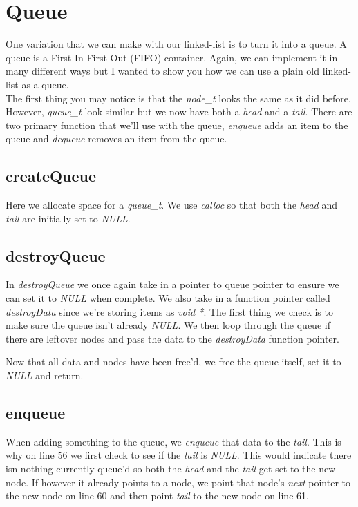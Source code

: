 \documentclass[../main.tex]{subfiles}
\begin{document}
	
	\section{Queue}
	One variation that we can make with our linked-list is to turn it into a queue.  A queue is a First-In-First-Out (FIFO) container.  Again, we can implement it in many different ways but I wanted to show you how we can use a plain old linked-list as a queue.\\
	
	
	
	The first thing you may notice is that the \textit{node\_t} looks the same as it did before.  However, \textit{queue\_t} look similar but we now have both a \textit{head} and a \textit{tail}.  There are two primary function that we'll use with the queue, \textit{enqueue} adds an item to the queue and \textit{dequeue} removes an item from the queue.\\
	
	
	
	\subsection{createQueue}
	Here we allocate space for a \textit{queue\_t}.  We use \textit{calloc} so that both the \textit{head} and \textit{tail} are initially set to \textit{NULL}.
	
	\subsection{destroyQueue}
	In \textit{destroyQueue} we once again take in a pointer to queue pointer to ensure we can set it to \textit{NULL} when complete.  We also take in a function pointer called \textit{destroyData} since we're storing items as \textit{void *}.  The first thing we check is to make sure the queue isn't already \textit{NULL}.  We then loop through the queue if there are leftover nodes and pass the data to the \textit{destroyData} function pointer.  
	
	Now that all data and nodes have been free'd, we free the queue itself, set it to \textit{NULL} and return.
	
	\subsection{enqueue}
	When adding something to the queue, we \textit{enqueue} that data to the \textit{tail}.  This is why on line 56 we first check to see if the \textit{tail} is \textit{NULL}.  This would indicate there isn nothing currently queue'd so both the \textit{head} and the \textit{tail} get set to the new node.  If however it already points to a node, we point that node's \textit{next} pointer to the new node on line 60 and then point \textit{tail} to the new node on line 61.
	
\end{document}
